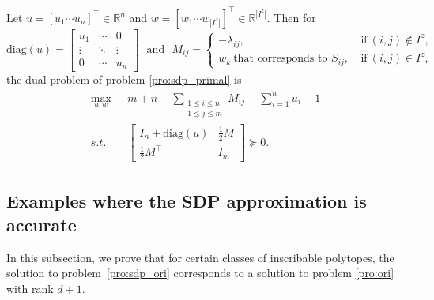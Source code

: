 \documentclass[smallextended, envcountsame]{svjour3}
\begin{document}
    Let $u=[u_1\cdots u_n]^\top\in\mathbb{R}^n$ and $w=[w_1\cdots w_{|I^z|}]^\top\in\mathbb{R}^{|I^z|}$.  Then for
    \begin{equation*}
        \mathrm{diag}(u) = \begin{bmatrix}
            u_1 & \cdots & 0\\
            \vdots & \ddots & \vdots\\
            0 & \cdots & u_n
        \end{bmatrix}~~~\text{and}~~~
        M_{ij}=\begin{cases}
            -\lambda_{ij}, &~\text{if}~(i,j)\notin I^z,\\
            w_k~\text{that corresponds to $S_{ij}$}, &~\text{if}~(i,j)\in I^z,
        \end{cases}
    \end{equation*}
    the dual problem of problem \eqref{pro:sdp_primal} is
    \begin{align}\label{pro:sdp_dual}\tag{D}
    \begin{split}
        \max_{u,w}~~~&m+n+\sum\limits_{\substack{1\le i\le n\\ 1\le j\le m}} M_{ij}-\sum\limits_{i=1}^n u_i + 1\\
        s.t.~~~& 
        \begin{bmatrix}
            I_n+\mathrm{diag}(u) & \frac{1}{2}M\\
            \frac{1}{2}M^\top & I_m
        \end{bmatrix} \succeq 0.
    \end{split}
    \end{align}


\subsection{Examples where the SDP approximation is accurate}\label{subsec:examples}
    In this subsection, we prove that for certain classes of inscribable polytopes, the solution to problem~\eqref{pro:sdp_ori} corresponds to a solution to problem \eqref{pro:ori} with rank $d+1$.  
\end{document}

